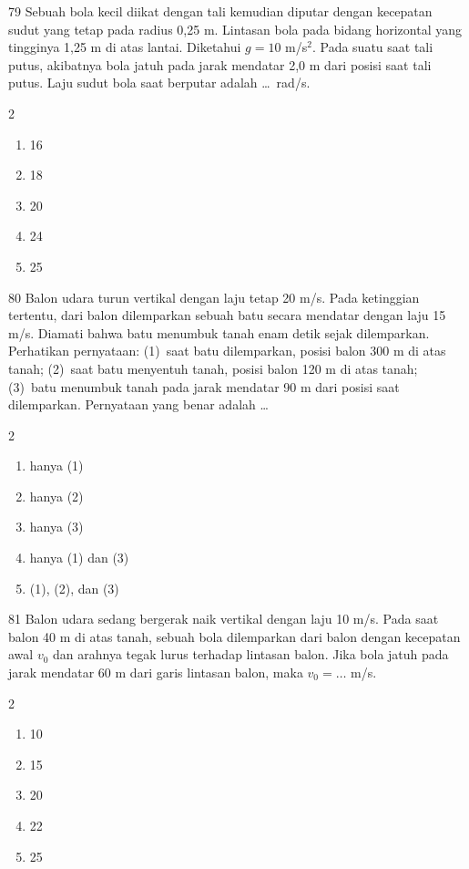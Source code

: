 \documentclass[11pt]{article}
\newenvironment{pilB}{%
  \par\smallskip\begin{multicols}{2}
  \begin{enumerate}[label=(\Alph*),leftmargin=*,itemsep=1pt,topsep=3pt]}%
  {\end{enumerate}\end{multicols}}
\begin{document}
\begin{soal}{79}
Sebuah bola kecil diikat dengan tali kemudian diputar dengan kecepatan
sudut yang tetap pada radius 0,25 m. Lintasan bola pada bidang horizontal
yang tingginya 1,25 m di atas lantai. Diketahui $g=10$ m/s$^2$. Pada
suatu saat tali putus, akibatnya bola jatuh pada jarak mendatar 2,0 m
dari posisi saat tali putus. Laju sudut bola saat berputar adalah
\ldots\ rad/s.
\begin{pilB}
  \item 16 \item 18 \item 20 \item 24 \item 25
\end{pilB}
\end{soal}

\begin{soal}{80}
Balon udara turun vertikal dengan laju tetap 20 m/s. Pada ketinggian
tertentu, dari balon dilemparkan sebuah batu secara mendatar dengan laju
15 m/s. Diamati bahwa batu menumbuk tanah enam detik sejak dilemparkan.
Perhatikan pernyataan: (1)~saat batu dilemparkan, posisi balon 300 m di
atas tanah; (2)~saat batu menyentuh tanah, posisi balon 120 m di atas
tanah; (3)~batu menumbuk tanah pada jarak mendatar 90 m dari posisi saat
dilemparkan. Pernyataan yang benar adalah \ldots
\begin{pilB}
  \item hanya (1) \item hanya (2) \item hanya (3)
  \item hanya (1) dan (3) \item (1), (2), dan (3)
\end{pilB}
\end{soal}

\begin{soal}{81}
Balon udara sedang bergerak naik vertikal dengan laju 10 m/s. Pada saat
balon 40 m di atas tanah, sebuah bola dilemparkan dari balon dengan
kecepatan awal $v_0$ dan arahnya tegak lurus terhadap lintasan balon.
Jika bola jatuh pada jarak mendatar 60 m dari garis lintasan balon,
maka $v_0=\ldots$ m/s.
\begin{pilB}
  \item 10 \item 15 \item 20 \item 22 \item 25
\end{pilB}
\end{soal}
\end{document}
